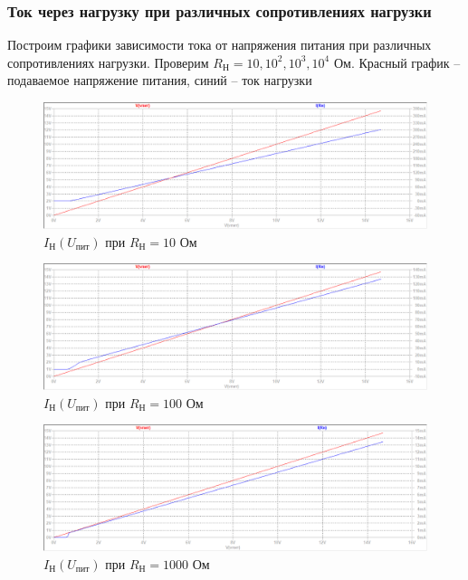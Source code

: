 \documentclass[a4paper, 12pt]{article}
\begin{document}
    \subsubsection{Ток через нагрузку при различных сопротивлениях нагрузки}
    Построим графики зависимости тока от напряжения питания при различных сопротивлениях нагрузки.
    Проверим $R_\text{Н}=10,10^2,10^3,10^4$ Ом. Красный график -- подаваемое напряжение питания,
    синий -- ток нагрузки
    \begin{figure}[H]
        \centering
        \includegraphics[scale=0.46]{1task_Iн(Vпит)_Rн10.png}
        \captionsetup{skip=0pt}
        \caption{$I_\text{Н}\left( U_\text{пит} \right)$ при $R_\text{Н}=10$ Ом}
        \label{fig:1task_InVlR10}
    \end{figure}
    \begin{figure}[H]
        \centering
        \includegraphics[scale=0.46]{1task_Iн(Vпит)_Rн100.png}
        \captionsetup{skip=0pt}
        \caption{$I_\text{Н}\left( U_\text{пит} \right)$ при $R_\text{Н}=100$ Ом}
        \label{fig:1task_InVlR100}
    \end{figure}
    \begin{figure}[H]
        \centering
        \includegraphics[scale=0.46]{1task_Iн(Vпит)_Rн1000.png}
        \captionsetup{skip=0pt}
        \caption{$I_\text{Н}\left( U_\text{пит} \right)$ при $R_\text{Н}=1000$ Ом}
        \label{fig:1task_InVlR1000}
    \end{figure}
\end{document}
